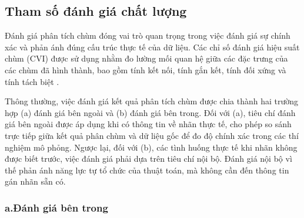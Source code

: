 \documentclass[a4paper,oneside]{book} %
\theoremstyle{plain}
\theoremstyle{plain}
\theoremstyle{nonumberplain}
\begin{document}
\subsection{Tham số đánh giá chất lượng}

Đánh giá phân tích chùm đóng vai trò quan trọng trong việc đánh giá sự chính xác và phản ánh đúng cấu trúc thực tế của dữ liệu. Các chỉ số đánh giá hiệu suất chùm (CVI) được sử dụng nhằm đo lường mối quan hệ giữa các đặc trưng của các chùm đã hình thành, bao gồm tính kết nối, tính gắn kết, tính đối xứng và tính tách biệt \cite{ikotun2025cluster}. 

Thông thường, việc đánh giá kết quả phân tích chùm được chia thành hai trường hợp (a) đánh giá bên ngoài và (b) đánh giá bên trong. Đối với (a), tiêu chí đánh giá bên ngoài được áp dụng khi có thông tin về nhãn thực tế, cho phép so sánh trực tiếp giữa kết quả phân chùm và dữ liệu gốc để đo độ chính xác trong các thí nghiệm mô phỏng. Ngược lại, đối với (b), các tình huống thực tế khi nhãn không được biết trước, việc đánh giá phải dựa trên tiêu chí nội bộ. Đánh giá nội bộ vì thế phản ánh năng lực tự tổ chức của thuật toán, mà không cần đến thông tin gán nhãn sẵn có.

\subsubsection{a.\quad Đánh giá bên trong}
\end{document}
